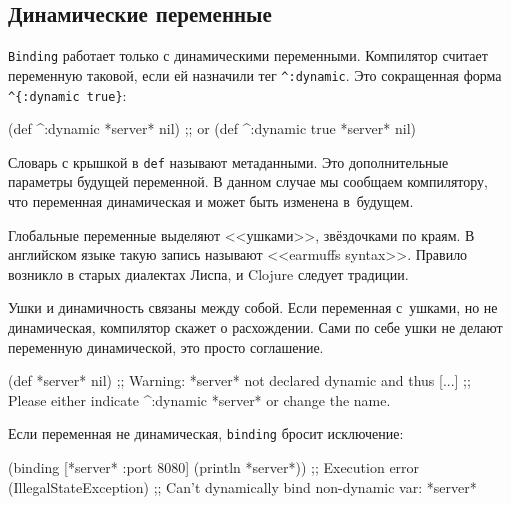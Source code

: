 \subsection{Динамические переменные}

\label{dynamic-vars}


\verb|Binding| работает только с динамическими переменными. Компилятор считает
переменную таковой, если ей назначили тег \verb|^:dynamic|. Это сокращенная
форма \verb|^{:dynamic true}|:

\begin{english}
  \begin{clojure}
(def ^:dynamic *server* nil)
;; or
(def ^{:dynamic true} *server* nil)
  \end{clojure}
\end{english}

Словарь с крышкой в \verb|def| называют метаданными. Это дополнительные
параметры будущей переменной. В данном случае мы сообщаем компилятору, что
переменная динамическая и может быть изменена в~будущем.

Глобальные переменные выделяют <<ушками>>, звёздочками по краям. В английском
языке такую запись называют <<earmuffs syntax>>. Правило возникло в старых
диалектах Лиспа, и Clojure следует традиции.


Ушки и динамичность связаны между собой. Если переменная с~ушками, но не
динамическая, компилятор скажет о расхождении. Сами по себе ушки не делают
переменную динамической, это просто соглашение.

\begin{english}
  \begin{clojure}
(def *server* nil)
;; Warning: *server* not declared dynamic and thus [...]
;; Please either indicate ^:dynamic *server* or change the name.
  \end{clojure}
\end{english}

\noindent
Если переменная не динамическая, \verb|binding| бросит исключение:

\begin{english}
  \begin{clojure}
(binding [*server* {:port 8080}]
  (println *server*))
;; Execution error (IllegalStateException)
;; Can't dynamically bind non-dynamic var: *server*
  \end{clojure}
\end{english}

